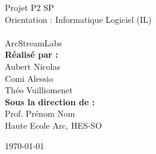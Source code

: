 \begin{titlepage}
\begin{flushright}
\huge Projet P2 SP\\[0.5cm]

\large Orientation : Informatique Logiciel (IL)\\[0.5cm]
~\\[1cm]
{
\Huge ArcStreamLabs \\[1.5cm]
}
{
\textbf{Réalisé par :}\\
\huge Aubert Nicolas\\[0.5cm]
\huge Comi Alessio\\[0.5cm]
\huge Théo Vuilliomenet\\[0.5cm]
}
{
\textbf{Sous la direction de :} \\
Prof. Prénom Nom\\
Haute Ecole Arc, HES-SO\\[0.5cm]
}

\vfill

{\today}

\end{flushright}
\end{titlepage}
